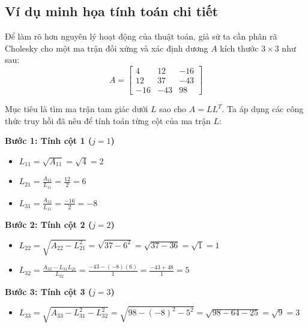 \documentclass[a4paper,12pt]{report}
\begin{document}
\subsection*{Ví dụ minh họa tính toán chi tiết}
Để làm rõ hơn nguyên lý hoạt động của thuật toán, giả sử ta cần phân rã Cholesky cho một ma trận đối xứng và xác định dương $A$ kích thước $3 \times 3$ như sau:
\[
  A =
  \begin{bmatrix}
    4 & 12 & -16 \\
    12 & 37 & -43 \\
    -16 & -43 & 98
  \end{bmatrix}
\]

Mục tiêu là tìm ma trận tam giác dưới $L$ sao cho $A = L L^T$. Ta áp dụng các công thức truy hồi đã nêu để tính toán từng cột của ma trận $L$:

\textbf{Bước 1: Tính cột 1 ($j=1$)}
\begin{itemize}
  \item $L_{11} = \sqrt{A_{11}} = \sqrt{4} = 2$
  \item $L_{21} = \frac{A_{21}}{L_{11}} = \frac{12}{2} = 6$
  \item $L_{31} = \frac{A_{31}}{L_{11}} = \frac{-16}{2} = -8$
\end{itemize}

\textbf{Bước 2: Tính cột 2 ($j=2$)}
\begin{itemize}
  \item $L_{22} = \sqrt{A_{22} - L_{21}^2} = \sqrt{37 - 6^2} = \sqrt{37 - 36} = \sqrt{1} = 1$
  \item $L_{32} = \frac{A_{32} - L_{31}L_{21}}{L_{22}} = \frac{-43 - (-8)(6)}{1} = \frac{-43 + 48}{1} = 5$
\end{itemize}

\textbf{Bước 3: Tính cột 3 ($j=3$)}
\begin{itemize}
  \item $L_{33} = \sqrt{A_{33} - L_{31}^2 - L_{32}^2} = \sqrt{98 - (-8)^2 - 5^2} = \sqrt{98 - 64 - 25} = \sqrt{9} = 3$
\end{itemize}
\end{document}

